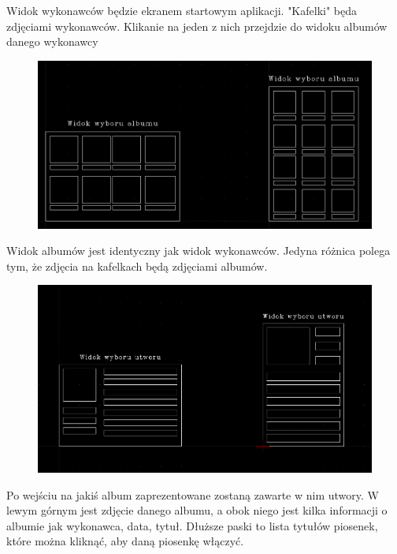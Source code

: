 Widok wykonawców będzie ekranem startowym aplikacji. "Kafelki" będa zdjęciami wykonawców. Klikanie na jeden z nich przejdzie do widoku albumów danego wykonawcy

\begin{figure}[H]
	\centering
	\includegraphics[width=1\textwidth]{images/mockup_albumy.png}
	\caption{}
\end{figure}

Widok albumów jest identyczny jak widok wykonawców. Jedyna różnica polega tym, że zdjęcia na kafelkach będą zdjęciami albumów.

\begin{figure}[H]
	\centering
	\includegraphics[width=1\textwidth]{images/mockup_utwory.png}
	\caption{}
\end{figure}

Po wejściu na jakiś album zaprezentowane zostaną zawarte w nim utwory. W lewym górnym jest zdjęcie danego albumu, a obok niego jest kilka informacji o albumie jak wykonawca, data, tytuł. Dłuższe paski to lista tytułów piosenek, które można kliknąć, aby daną piosenkę włączyć.

